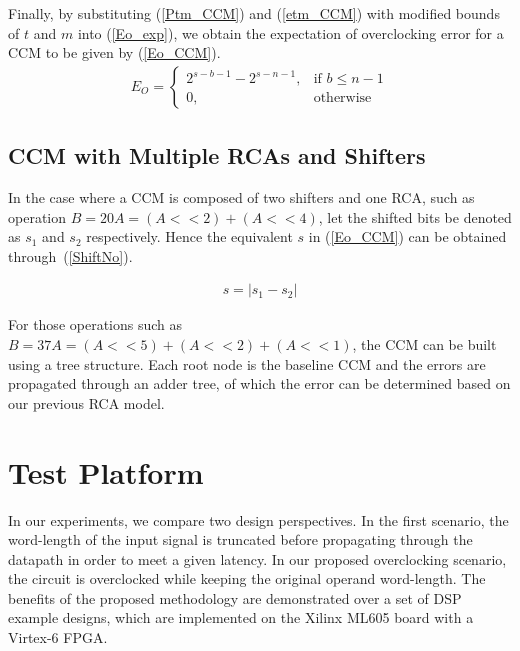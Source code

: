 \documentclass[prodmode,acmtrets]{acmsmall} %
\begin{document}
Finally, by substituting (\ref{Ptm_CCM}) and (\ref{etm_CCM}) with modified bounds of $t$ and $m$ into (\ref{Eo_exp}), we obtain the expectation of overclocking error for a CCM to be given by (\ref{Eo_CCM}).
%
\begin{eqnarray}\label{Eo_CCM}
      E_O=\left\{
        \begin{matrix}
            2^{s-b-1}-2^{s-n-1}, & \textrm{if $b\leq n-1$}\\
            0, & \textrm{otherwise}
        \end{matrix}
      \right.
\end{eqnarray}

\subsection{CCM with Multiple RCAs and Shifters}\label{CCM_Multi}
In the case where a CCM is composed of two shifters and one RCA, such as operation $\!B\!=\!20A\!=\!(\!A<<2)+(\!A<<4)$, let the shifted bits be denoted as $s_1$ and $s_2$ respectively. Hence the equivalent $s$ in (\ref{Eo_CCM}) can be obtained through~(\ref{ShiftNo}).

\begin{eqnarray}\label{ShiftNo}
  s=\left|s_1-s_2\right|
\end{eqnarray}

For those operations such as $B=37A=(A<<5)+(A<<2)+(A<<1)$, the CCM can be built using a tree structure. Each root node is the baseline CCM and the errors are propagated through an adder tree, of which the error can be determined based on our previous RCA model.

\section{Test Platform}\label{Section_ExpSetup}
In our experiments, we compare two design perspectives. In the first scenario, the word-length of the input signal is truncated before propagating through the datapath in order to meet a given latency. In our proposed overclocking scenario, the circuit is overclocked while keeping the original operand word-length. The benefits of the proposed methodology are demonstrated over a set of DSP example designs, which are implemented on the Xilinx ML605 board with a Virtex-6 FPGA.
\end{document}
